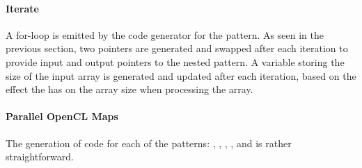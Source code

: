 \paragraph{Iterate}
A for-loop is emitted by the code generator for the \iterateN pattern.
As seen in the previous section, two pointers are generated and swapped after each iteration to provide input and output pointers to the nested pattern.
A variable storing the size of the input array is generated and updated after each iteration, based on the effect the  has on the array size when processing the array.


\paragraph{Parallel OpenCL Maps}
The generation of \OpenCL code for each of the \map patterns: \mapWorkgroup, \mapLocal, \mapGlobal, \mapWarp, and \mapLane is rather straightforward.

